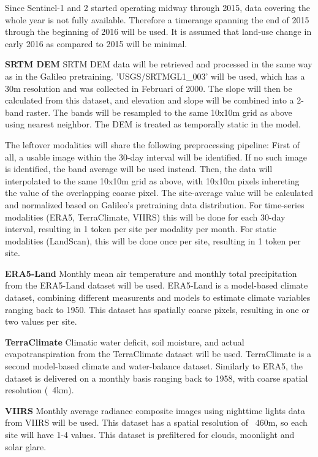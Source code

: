 \documentclass[a4paper,12pt]{article}
\begin{document}
Since Sentinel-1 and 2 started operating midway through 2015, data covering the whole year is not fully available. Therefore a timerange spanning the end of 2015 through the beginning of 2016 will be used. It is assumed that land-use change in early 2016 as compared to 2015 will be minimal.

\textbf{SRTM \ac{DEM}} SRTM \ac{DEM} data will be retrieved and processed in the same way as in the Galileo pretraining. 'USGS/SRTMGL1\_003' will be used, which has a 30m resolution and was collected in Februari of 2000. The slope will then be calculated from this dataset, and elevation and slope will be combined into a 2-band raster. The bands will be resampled to the same 10x10m grid as above using nearest neighbor. The \ac{DEM} is treated as temporally static in the model.

The leftover modalities will share the following preprocessing pipeline: First of all, a usable image within the 30-day interval will be identified. If no such image is identified, the band average will be used instead. Then, the data will interpolated to the same 10x10m grid as above, with 10x10m pixels inhereting the value of the overlapping coarse pixel. The site-average value will be calculated and normalized based on Galileo's pretraining data distribution. For time-series modalities (ERA5, TerraClimate, VIIRS) this will be done for each 30-day interval, resulting in 1 token per site per modality per month. For static modalities (LandScan), this will be done once per site, resulting in 1 token per site.

\textbf{ERA5-Land} Monthly mean air temperature and monthly total precipitation from the ERA5-Land dataset  \citep{munoz-sabaterERA5LandStateoftheartGlobal2021} will be used. ERA5-Land is a model-based climate dataset, combining different measurents and models to estimate climate variables ranging back to 1950. This dataset has spatially coarse pixels, resulting in one or two values per site.

\textbf{TerraClimate} Climatic water deficit, soil moisture, and actual evapotranspiration from the TerraClimate dataset \citep{abatzoglouTerraClimateHighresolutionGlobal2018} will be used. TerraClimate is a second model-based climate and water-balance dataset. Similarly to ERA5, the dataset is delivered on a monthly basis ranging back to 1958, with coarse spatial resolution (~4km).

\textbf{VIIRS} Monthly average radiance composite images using nighttime lights data from VIIRS \citep{elvidgeVIIRSNighttimeLights2017} will be used. This dataset has a spatial resolution of ~460m, so each site will have 1-4 values. This dataset is prefiltered for clouds, moonlight and solar glare.
\end{document}

